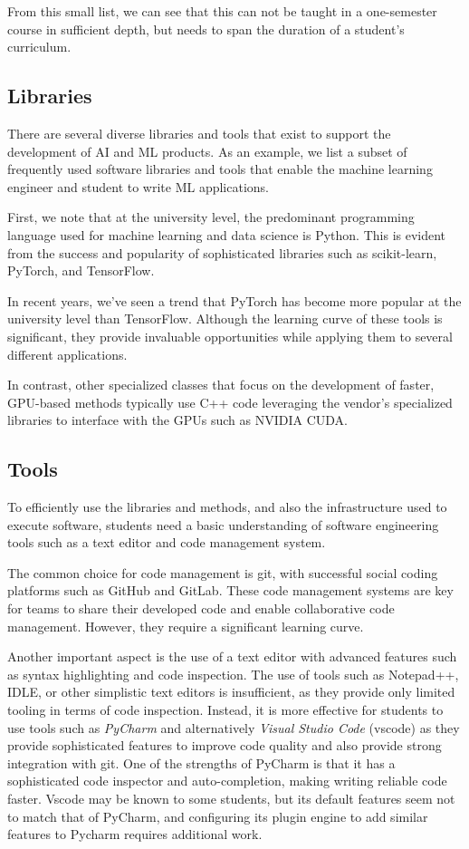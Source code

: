 \documentclass[utf8]{FrontiersinVancouver} %
\begin{document}
From this small list, we can see that this can not be taught
in a one-semester course in sufficient depth, but needs to span the
duration of a student's curriculum.

\subsection{Libraries}

There are several diverse libraries and tools that exist to support the
development of AI and ML products.  As an example, we list a subset
of frequently used software libraries and tools that enable the
machine learning engineer and student to write ML applications.

First, we note that at the university level, the predominant programming language
used for machine learning and data science is Python. This is
evident from the success and popularity of sophisticated libraries such as
scikit-learn, PyTorch, and TensorFlow.

In recent years, we've seen a trend that PyTorch has become more popular at
the university level than TensorFlow.  Although the learning curve of
these tools is significant, they provide invaluable opportunities
while applying them to several different applications.

In contrast, other specialized classes that focus on the development
of faster, GPU-based methods typically use C++ code leveraging the
vendor's specialized libraries to interface with the GPUs such as
NVIDIA CUDA.

\subsection{Tools}\label{sec:tools}

To efficiently use the libraries and methods, and also the
infrastructure used to execute software, students need a basic understanding of software engineering
tools such as a text editor and code management system.

The common choice for code management is git, with successful social coding
platforms such as GitHub and GitLab.  These code management systems are key
for teams to share their developed code and enable collaborative code management.
However, they require a significant learning curve.

Another important aspect is the use of a text editor with advanced features such as
syntax highlighting and code inspection. The use of
tools such as Notepad++, IDLE, or other simplistic text editors is
insufficient, as they provide only limited tooling in terms of code inspection.
Instead, it is more effective for students to use tools such as {\em
  PyCharm} and alternatively {\em Visual Studio Code} (vscode) as they provide
sophisticated features to improve code quality and also provide strong
integration with git. One of the strengths of PyCharm is that it has a
sophisticated code inspector and auto-completion, making writing
reliable code faster. Vscode may be known to some students, but its
default features seem not to match that of PyCharm, and configuring its
plugin engine to add similar features to Pycharm requires additional work.
\end{document}
